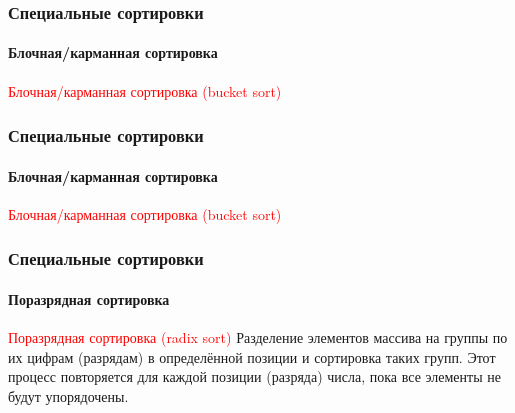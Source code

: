 \documentclass[aspectratio=169]{beamer}
\begin{document}
\begin{frame}
\frametitle{Специальные сортировки}
\framesubtitle{Блочная/карманная сортировка}
\justifying
\textcolor{red}{Блочная/карманная сортировка (bucket sort)}
\begin{figure}
    \captionsetup[subfigure]{labelformat=empty}
    \centering
    \newline
\end{figure}
\end{frame}

\begin{frame}
\frametitle{Специальные сортировки}
\framesubtitle{Блочная/карманная сортировка}
\justifying
\textcolor{red}{Блочная/карманная сортировка (bucket sort)}
\begin{figure}
    \captionsetup[subfigure]{labelformat=empty}
    \centering
\end{figure}
\end{frame}

\begin{frame}
\frametitle{Специальные сортировки}
\framesubtitle{Поразрядная сортировка}
\justifying
\textcolor{red}{Поразрядная сортировка (radix sort)}\newline
Разделение элементов массива на группы по их цифрам (разрядам) в определённой позиции и сортировка таких групп. Этот процесс повторяется для каждой позиции (разряда) числа, пока все элементы не будут упорядочены.\newline
\begin{figure}
    \captionsetup[subfigure]{labelformat=empty}
    \centering
\end{figure}
\end{frame}
\end{document}
